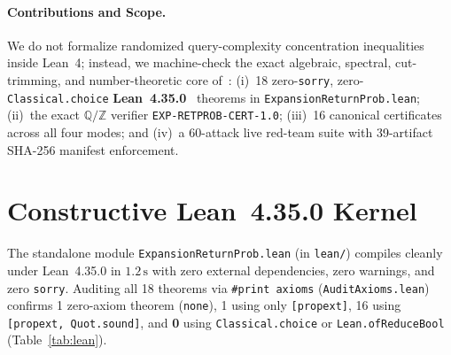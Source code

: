 \documentclass[10pt,twocolumn]{article}
\begin{document}
\paragraph{Contributions and Scope.}
We do not formalize randomized query-complexity concentration inequalities inside Lean~4; instead, we machine-check the exact algebraic, spectral, cut-trimming, and number-theoretic core of~\cite{melissaris2026testing}:
(i)~18 zero-\texttt{sorry}, zero-\texttt{Classical.choice} \textbf{Lean~4.35.0}~\cite{demoura2021lean4} theorems in \texttt{ExpansionReturnProb.lean};
(ii)~the exact $\mathbb{Q}/\mathbb{Z}$ verifier \texttt{EXP-RETPROB-CERT-1.0};
(iii)~16 canonical certificates across all four modes; and
(iv)~a 60-attack live red-team suite with 39-artifact SHA-256 manifest enforcement.

\section{Constructive Lean~4.35.0 Kernel}\label{sec:lean}
The standalone module \texttt{ExpansionReturnProb.lean} (in \texttt{lean/}) compiles cleanly under Lean~4.35.0 in $1.2\,\mathrm{s}$ with zero external dependencies, zero warnings, and zero \texttt{sorry}. Auditing all 18 theorems via \texttt{\#print axioms} (\texttt{AuditAxioms.lean}) confirms 1 zero-axiom theorem (\texttt{none}), 1 using only \texttt{[propext]}, 16 using \texttt{[propext, Quot.sound]}, and \textbf{0} using \texttt{Classical.choice} or \texttt{Lean.ofReduceBool} (Table~\ref{tab:lean}).
\end{document}
